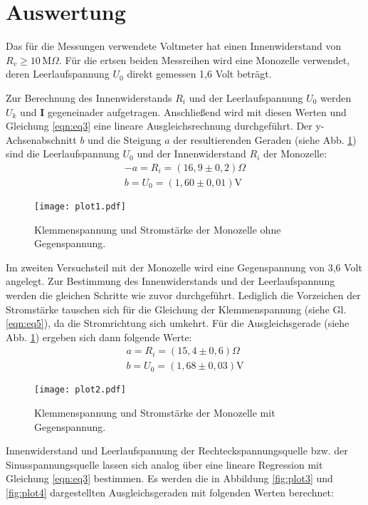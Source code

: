 \section{Auswertung}
\label{sec:Auswertung}

Das für die Messungen verwendete Voltmeter hat einen Innenwiderstand von $R_v \geq 10 \, \text{M}\Omega $.
Für die ertsen beiden Messreihen wird eine Monozelle verwendet, deren Leerlaufspannung $U_0$ direkt gemessen 1,6 Volt beträgt.

Zur Berechnung des Innenwiderstands $R_i$ und der Leerlaufspannung $U_0$ werden $U_k$ und $\symbf{I}$ gegeneinader aufgetragen.
Anschließend wird mit diesen Werten und Gleichung \eqref{eqn:eq3} eine lineare Ausgleichsrechnung durchgeführt.
Der y-Achsenabschnitt $b$ und die Steigung $a$ der resultierenden Geraden (siehe Abb. \ref{fig:plot1}) sind die Leerlaufspannung $U_0$ und der Innenwiderstand $R_i$ der Monozelle:
\begin{align*}
  -a = R_i = (16,9 \pm 0,2) \Omega \\
  b = U_0 = (1,60 \pm 0,01) \text{V}
\end{align*}
\begin{figure}
  \centering
  \texttt{[image: plot1.pdf]}
  \caption{Klemmenspannung und Stromstärke der Monozelle ohne Gegenspannung.}
  \label{fig:plot1}
\end{figure}
Im zweiten Versuchsteil mit der Monozelle wird eine Gegenspannung von 3,6 Volt angelegt.
Zur Bestimmung des Innenwiderstands und der Leerlaufspannung werden die gleichen Schritte wie zuvor durchgeführt.
Lediglich die Vorzeichen der Stromstärke tauschen sich für die Gleichung der Klemmenspannung (siehe Gl. \eqref{eqn:eq5}), da die Stromrichtung sich umkehrt.
Für die Ausgleichsgerade (siehe Abb. \ref{fig:plot1}) ergeben sich dann folgende Werte:
\begin{align*}
  a = R_i = (15,4 \pm 0,6) \Omega \\
  b = U_0 = (1,68 \pm 0,03) \text{V}
\end{align*}
\begin{figure}
  \centering
  \texttt{[image: plot2.pdf]}
  \caption{Klemmenspannung und Stromstärke der Monozelle mit Gegenspannung.}
  \label{fig:plot2}
\end{figure}
Innenwiderstand und Leerlaufspannung der Rechteckspannungsquelle bzw. der Sinusspannungsquelle lassen sich analog über eine lineare Regression mit Gleichung \eqref{eqn:eq3} bestimmen.
Es werden die in Abbildung \ref{fig:plot3} und \ref{fig:plot4} dargestellten Ausgleichsgeraden mit folgenden Werten berechnet:
